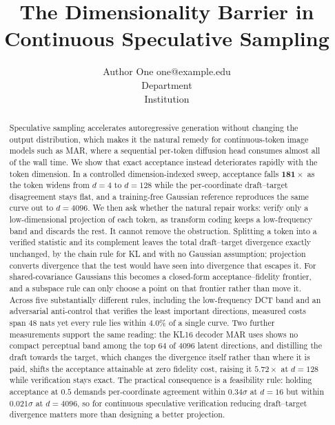\documentclass[10pt]{article}
\title{The Dimensionality Barrier in Continuous Speculative Sampling}
\author{\name Author One \email one@example.edu \\
      \addr Department\\
      Institution}
\newcommand{\dd}{d}
\newcommand{\best}[1]{\bm{#1}}
\begin{document}
\maketitle

\begin{abstract}
Speculative sampling accelerates autoregressive generation without changing the output distribution,
which makes it the natural remedy for continuous-token image models such as MAR, where a sequential
per-token diffusion head consumes almost all of the wall time. We show that exact acceptance instead
deteriorates rapidly with the token dimension. In a controlled dimension-indexed sweep, acceptance
falls $\best{181\times}$ as the token widens from $\dd{=}4$ to $\dd{=}128$ while the per-coordinate
draft--target disagreement stays flat, and a training-free Gaussian reference reproduces the same
curve out to $\dd{=}4096$. We then ask whether the natural repair works: verify only a
low-dimensional projection of each token, as transform coding keeps a low-frequency band and discards
the rest. It cannot remove the obstruction. Splitting a token into a verified statistic and its
complement leaves the total draft--target divergence exactly unchanged, by the chain rule for KL and
with no Gaussian assumption; projection converts divergence that the test would have seen into
divergence that escapes it. For shared-covariance Gaussians this becomes a closed-form
acceptance--fidelity frontier, and a subspace rule can only choose a point on that frontier rather
than move it. Across five substantially different rules, including the low-frequency DCT band and an
adversarial anti-control that verifies the least important directions, measured costs span $48$ nats
yet every rule lies within $\best{4.0\%}$ of a single curve. Two further measurements support the
same reading: the KL16 decoder MAR uses shows no compact perceptual band among the top $64$ of
$4096$ latent directions, and distilling the draft towards the target, which changes the divergence
itself rather than where it is paid, shifts the acceptance attainable at zero fidelity cost, raising
it $\best{5.72\times}$ at $\dd{=}128$ while verification stays exact. The practical consequence is a feasibility
rule: holding acceptance at $0.5$ demands per-coordinate agreement within $0.34\sigma$ at
$\dd{=}16$ but within $0.021\sigma$ at $\dd{=}4096$, so for continuous speculative verification
reducing draft--target divergence matters more than designing a better projection.
\end{abstract}
\end{document}
